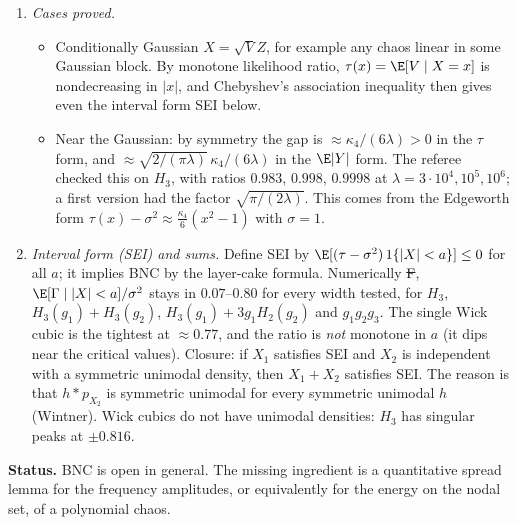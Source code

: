 \begin{enumerate}
\item \emph{Cases proved.}
\begin{itemize}
\item Conditionally Gaussian $X=\sqrt VZ$, for example any chaos linear in some Gaussian block. By monotone likelihood ratio, $\tau(x)=\E[V\mid X=x]$ is nondecreasing in $|x|$, and
Chebyshev's association inequality then gives even the interval form SEI below.
\item Near the Gaussian: by symmetry the gap is $\approx\kappa_4/(6\lambda)>0$ in the $\tau$ form, and $\approx\sqrt{2/(\pi\lambda)}\,\kappa_4/(6\lambda)$ in the $\E|Y|$ form. The referee checked
this on $H_3$, with ratios $0.983$, $0.998$, $0.9998$ at $\lambda=3\cdot10^4,10^5,10^6$; a first version had the factor $\sqrt{\pi/(2\lambda)}$. This comes from the Edgeworth form $\tau(x)-\sigma^2\approx\frac{\kappa_4}6(x^2-1)$ with $\sigma=1$.
\end{itemize}
\item \emph{Interval form (SEI) and sums.} Define SEI by $\E[(\tau-\sigma^2)\,1\{|X|<a\}]\le0$ for all $a$; it implies BNC by the layer-cake formula. Numerically \st{F}, $\E[\Gamma\mid|X|<a]/\sigma^2$
stays in $0.07$--$0.80$ for every width tested, for $H_3$, $H_3(g_1)+H_3(g_2)$, $H_3(g_1)+3g_1H_2(g_2)$ and $g_1g_2g_3$. The single Wick cubic is the tightest at $\approx0.77$, and the
ratio is \emph{not} monotone in $a$ (it dips near the critical values). Closure: if $X_1$ satisfies SEI and $X_2$ is independent with a symmetric unimodal density, then $X_1+X_2$ satisfies
SEI. The reason is that $h*p_{X_2}$ is symmetric unimodal for every symmetric unimodal $h$ (Wintner). Wick cubics do not have unimodal densities: $H_3$ has singular peaks at $\pm0.816$.
\end{enumerate}
\textbf{Status.} BNC is open in general. The missing ingredient is a quantitative spread lemma for the frequency amplitudes, or equivalently for the energy on the nodal set, of a polynomial
chaos.

